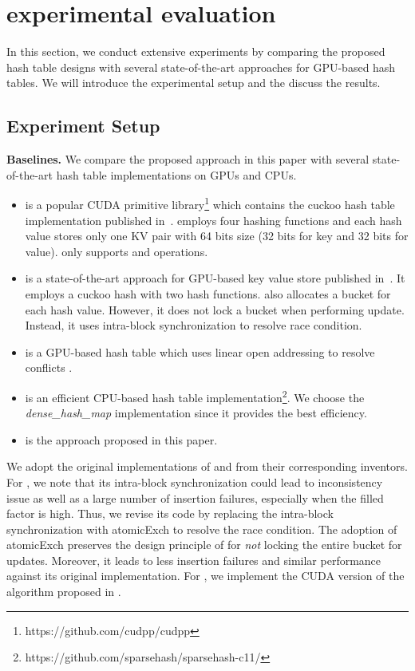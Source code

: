 \section{experimental evaluation}\label{sec:exp}
In this section, we conduct extensive experiments by comparing the proposed hash table designs with several state-of-the-art approaches for GPU-based hash tables. 
We will introduce the experimental setup and the discuss the results. 

\subsection{Experiment Setup}\label{sec:exp:setup}

\vspace{1mm}\noindent\textbf{Baselines.} We compare the proposed approach in this paper with several state-of-the-art hash table implementations on GPUs and CPUs. 
\begin{itemize}
	\item \cudpp is a popular CUDA primitive library\footnote{https://github.com/cudpp/cudpp} which contains the cuckoo hash table implementation published in~\cite{alcantara2009real}. 
	\cudpp employs four hashing functions and each hash value stores only one KV pair with 64 bits size (32 bits for key and 32 bits for value). 
	\cudpp only supports  and  operations. 
	\item \megakv is a state-of-the-art approach for GPU-based key value store published in~\cite{zhang2015mega}. It employs a cuckoo hash with two hash functions.
	\megakv also allocates a bucket for each hash value. However, it does not lock a bucket when performing update. Instead, it uses intra-block synchronization to resolve race condition. 
	\item \linear is a GPU-based hash table which uses linear open addressing to resolve conflicts \cite{hong2010mapcg}. 
	\item \google is an efficient CPU-based hash table implementation\footnote{https://github.com/sparsehash/sparsehash-c11/}. We choose the \emph{dense\_hash\_map} implementation since it provides the best efficiency.
	\item \voter is the approach proposed in this paper.
\end{itemize}
We adopt the original implementations of \cudpp and from their corresponding inventors. 
For \megakv, we note that its intra-block synchronization could lead to inconsistency issue as well as a large number of insertion failures, especially when the filled factor is high.  
Thus, we revise its code by replacing the intra-block synchronization with atomicExch to resolve the race condition. The adoption of atomicExch preserves the design principle of \megakv for \emph{not} locking the entire bucket for updates. Moreover, it leads to less insertion failures and similar performance against its original implementation. 
For \linear, we implement the CUDA version of the algorithm proposed in \cite{hong2010mapcg}.

